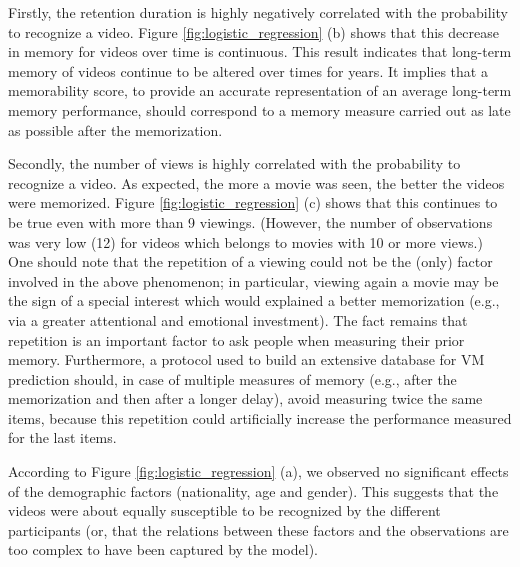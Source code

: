 \documentclass[sigconf]{acmart}
\begin{document}
Firstly, the retention duration is highly negatively correlated with the probability to recognize a video.
Figure \ref{fig:logistic_regression} (b) shows that this decrease in memory for videos over time is continuous.
This result indicates that long-term memory of videos continue to be altered over times for years.
It implies that a memorability score, to provide an accurate representation of an average long-term memory performance, should correspond to a memory measure carried out as late as possible after the memorization.

Secondly, the number of views is highly correlated with the probability to recognize a video.
As expected, the more a movie was seen, the better the videos were memorized.
Figure \ref{fig:logistic_regression} (c) shows that this continues to be true even with more than 9 viewings.
(However, the number of observations was very low (12) for videos which belongs to movies with 10 or more views.)
One should note that the repetition of a viewing could not be the (only) factor involved in the above phenomenon; in particular, viewing again a movie may be the sign of a special interest which would explained a better memorization (e.g., via a greater attentional and emotional investment).
The fact remains that repetition is an important factor to ask people when measuring their prior memory.
Furthermore, a protocol used to build an extensive database for VM prediction should, in case of multiple measures of memory (e.g., after the memorization and then after a longer delay), avoid measuring twice the same items, because this repetition could artificially increase the performance measured for the last items.

According to Figure \ref{fig:logistic_regression} (a), we observed no significant effects of the demographic factors (nationality, age and gender).
This suggests that the videos were about equally susceptible to be recognized by the different participants (or, that the relations between these factors and the observations are too complex to have been captured by the model).

\end{document}
